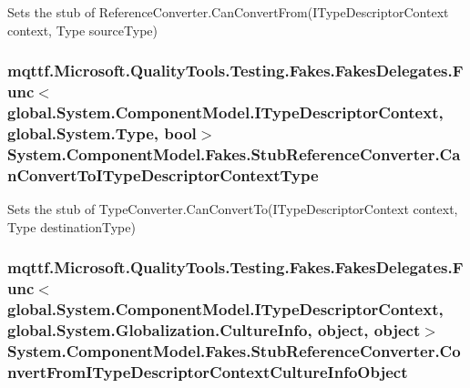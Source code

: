 Sets the stub of Reference\-Converter.\-Can\-Convert\-From(\-I\-Type\-Descriptor\-Context context, Type source\-Type)

\hypertarget{class_system_1_1_component_model_1_1_fakes_1_1_stub_reference_converter_a4275dd9d19844044294457db585bedb4}{
\subsubsection[{Can\-Convert\-To\-I\-Type\-Descriptor\-Context\-Type}]{\setlength{\rightskip}{0pt plus 5cm}mqttf.\-Microsoft.\-Quality\-Tools.\-Testing.\-Fakes.\-Fakes\-Delegates.\-Func$<$global.\-System.\-Component\-Model.\-I\-Type\-Descriptor\-Context, global.\-System.\-Type, bool$>$ System.\-Component\-Model.\-Fakes.\-Stub\-Reference\-Converter.\-Can\-Convert\-To\-I\-Type\-Descriptor\-Context\-Type}}\label{class_system_1_1_component_model_1_1_fakes_1_1_stub_reference_converter_a4275dd9d19844044294457db585bedb4}


Sets the stub of Type\-Converter.\-Can\-Convert\-To(\-I\-Type\-Descriptor\-Context context, Type destination\-Type)

\hypertarget{class_system_1_1_component_model_1_1_fakes_1_1_stub_reference_converter_a9ad852eac3f7f673c0903a0c243b9f35}{
\subsubsection[{Convert\-From\-I\-Type\-Descriptor\-Context\-Culture\-Info\-Object}]{\setlength{\rightskip}{0pt plus 5cm}mqttf.\-Microsoft.\-Quality\-Tools.\-Testing.\-Fakes.\-Fakes\-Delegates.\-Func$<$global.\-System.\-Component\-Model.\-I\-Type\-Descriptor\-Context, global.\-System.\-Globalization.\-Culture\-Info, object, object$>$ System.\-Component\-Model.\-Fakes.\-Stub\-Reference\-Converter.\-Convert\-From\-I\-Type\-Descriptor\-Context\-Culture\-Info\-Object}}\label{class_system_1_1_component_model_1_1_fakes_1_1_stub_reference_converter_a9ad852eac3f7f673c0903a0c243b9f35}


